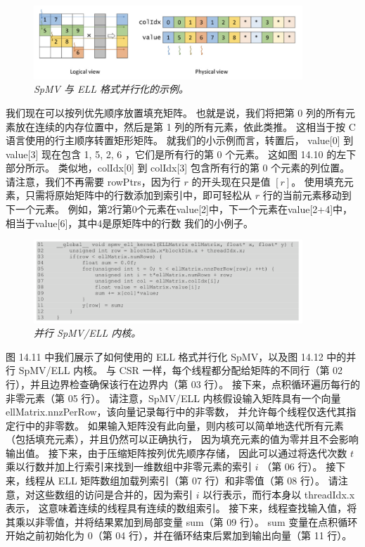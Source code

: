 \begin{figure}[H]
	\centering
	\includegraphics[width=0.9\textwidth]{figs/F14.11.png}
	\caption{\textit{SpMV 与 ELL 格式并行化的示例。}}
\end{figure}

我们现在可以按列优先顺序放置填充矩阵。 
也就是说，我们将把第 0 列的所有元素放在连续的内存位置中，然后是第 1 列的所有元素，依此类推。 
这相当于按 $\mathrm{C}$ 语言使用的行主顺序转置矩形矩阵。 
就我们的小示例而言，转置后， value[0] 到 value[3] 现在包含 1, 5, 2, 6 ，它们是所有行的第 0 个元素。 
这如图 14.10 的左下部分所示。 类似地，colIdx[0] 到 colIdx[3] 包含所有行的第 0 个元素的列位置。 
请注意，我们不再需要 rowPtrs，因为行 $r$ 的开头现在只是值 $[r]$。 
使用填充元素，只需将原始矩阵中的行数添加到索引中，即可轻松从 $r$ 行的当前元素移动到下一个元素。 
例如，第2行第0个元素在value[2]中，下一个元素在value[2+4]中，相当于value[6]，其中4是原矩阵中的行数 我们的小例子。

\begin{figure}[H]
	\centering
	\includegraphics[width=0.9\textwidth]{figs/F14.12.png}
	\caption{\textit{并行 SpMV/ELL 内核。}}
\end{figure}

图 14.11 中我们展示了如何使用的 ELL 格式并行化 SpMV，以及图 14.12 中的并行 SpMV/ELL 内核。 
与 CSR 一样，每个线程都分配给矩阵的不同行（第 02 行），并且边界检查确保该行在边界内（第 03 行）。 
接下来，点积循环遍历每行的非零元素（第 05 行）。 
请注意，SpMV/ELL 内核假设输入矩阵具有一个向量 ellMatrix.nnzPerRow，该向量记录每行中的非零数，
并允许每个线程仅迭代其指定行中的非零数。 
如果输入矩阵没有此向量，则内核可以简单地迭代所有元素（包括填充元素），并且仍然可以正确执行，
因为填充元素的值为零并且不会影响输出值。 接下来，由于压缩矩阵按列优先顺序存储，
因此可以通过将迭代次数 $t$ 乘以行数并加上行索引来找到一维数组中非零元素的索引 $i$ （第 06 行）。 
接下来，线程从 ELL 矩阵数组加载列索引（第 07 行）和非零值（第 08 行）。 
请注意，对这些数组的访问是合并的，因为索引 $i$ 以行表示，而行本身以 threadIdx.x 表示，
这意味着连续的线程具有连续的数组索引。 接下来，线程查找输入值，将其乘以非零值，并将结果累加到局部变量 sum（第 09 行）。 
sum 变量在点积循环开始之前初始化为 0（第 04 行），并在循环结束后累加到输出向量（第 11 行）。

